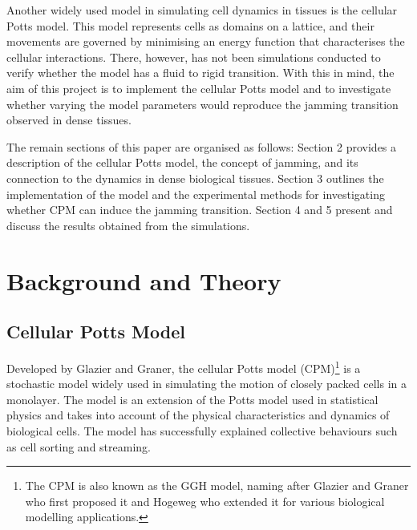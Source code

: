 \documentclass[a4paper,12pt]{article}
\begin{document}
Another widely used model in simulating cell dynamics in tissues is the cellular Potts model. This model represents cells as domains on a lattice, and their movements are governed by minimising an energy function that characterises the cellular interactions. There, however, has not been simulations conducted to verify whether the model has a fluid to rigid transition. With this in mind, the aim of this project is to implement the cellular Potts model and to investigate whether varying the model parameters would reproduce the jamming transition observed in dense tissues. 

The remain sections of this paper are organised as follows: Section 2 provides a description of the cellular Potts model, the concept of jamming, and its connection to the dynamics in dense biological tissues. Section 3 outlines the implementation of the model and the experimental methods for investigating whether CPM can induce the jamming transition. Section 4 and 5 present and discuss the results obtained from the simulations. 


%


\section{Background and Theory}
\subsection{Cellular Potts Model}
Developed by Glazier and Graner\cite{graner1992}, the cellular Potts model (CPM)\footnote{The CPM is also known as the GGH model, naming after Glazier and Graner who first proposed it and Hogeweg who extended it for various biological modelling applications.} is a stochastic model widely used in simulating the motion of closely packed cells in a monolayer. The model is an extension of the Potts model used in statistical physics and takes into account of the physical characteristics and dynamics of biological cells. The model has successfully explained collective behaviours such as cell sorting \cite{graner1992} and streaming\cite{szabo2010}.
\end{document}
